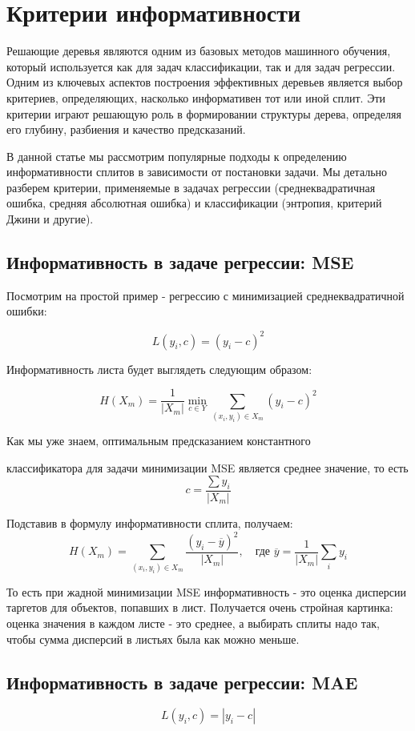 \section*{Критерии информативности}

Решающие деревья являются одним из базовых методов машинного обучения, который используется как для задач классификации, так и для задач регрессии. Одним из ключевых аспектов построения эффективных деревьев является выбор критериев, определяющих, насколько информативен тот или иной сплит. Эти критерии играют решающую роль в формировании структуры дерева, определяя его глубину, разбиения и качество предсказаний. 

В данной статье мы рассмотрим популярные подходы к определению информативности сплитов в зависимости от постановки задачи. Мы детально разберем критерии, применяемые в задачах регрессии (среднеквадратичная ошибка, средняя абсолютная ошибка) и классификации (энтропия, критерий Джини и другие).


\subsection*{Информативность в задаче регрессии: MSE}
Посмотрим на простой пример - регрессию с минимизацией среднеквадратичной ошибки:

\[
    L\left(y_{i}, c\right)=\left(y_{i}-c\right)^{2}
\]

Информативность листа будет выглядеть следующим образом:

\[
    H\left(X_{m}\right)=\frac{1}{\left|X_{m}\right|} \min _{c \in Y} \sum_{\left(x_{i}, y_{i}\right) \in X_{m}}\left(y_{i}-c\right)^{2}
\]

Как мы уже знаем, оптимальным предсказанием константного

классификатора для задачи минимизации MSE является среднее значение, то есть
\[
    c=\frac{\sum y_{i}}{\left|X_{m}\right|}
\]

Подставив в формулу информативности сплита, получаем:
\[
    H(X_m) = \sum_{(x_i, y_i) \in X_m} \frac{(y_i - \overline{y})^2}{|X_m|}, \quad \text{где } \overline{y} = \frac{1}{|X_m|} \sum_i y_i
\]

То есть при жадной минимизации MSE информативность - это оценка дисперсии таргетов для объектов, попавших в лист. Получается очень стройная картинка: оценка значения в каждом листе - это среднее, а выбирать сплиты надо так, чтобы сумма дисперсий в листьях была как можно меньше.

\subsection*{Информативность в задаче регрессии: MAE}
\[
    L\left(y_{i}, c\right)=\left|y_{i}-c\right|
\]

